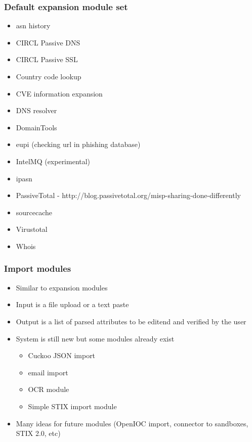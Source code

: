 \begin{frame}[fragile]
        \frametitle{Default expansion module set}
        \begin{itemize}
                \item asn history
                \item CIRCL Passive DNS
                \item CIRCL Passive SSL
                \item Country code lookup
                \item CVE information expansion
                \item DNS resolver
                \item DomainTools
                \item eupi (checking url in phishing database)
                \item IntelMQ (experimental)
                \item ipasn
                \item PassiveTotal - http://blog.passivetotal.org/misp-sharing-done-differently
                \item sourcecache
                \item Virustotal
                \item Whois
        \end{itemize}
\end{frame}

\begin{frame}[fragile]
        \frametitle{Import modules}
        \begin{itemize}
            \item Similar to expansion modules
            \item Input is a file upload or a text paste
            \item Output is a list of parsed attributes to be editend and verified by the user
            \item System is still new but some modules already exist
            \begin{itemize}
                \item Cuckoo JSON import
                \item email import
                \item OCR module
                \item Simple STIX import module
            \end{itemize}
            \item Many ideas for future modules (OpenIOC import, connector to sandboxes, STIX 2.0, etc)
       \end{itemize}
\end{frame}

